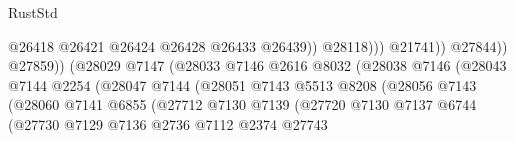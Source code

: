 \begin{lexlean}{RustStd}
\begin{coremodule}
                                                          @26418
                                                          @26421
                                                          @26424
                                                          @26428
                                                          @26433
                                                          @26439))
                                                      @28118)))
                                                @21741))
                                            @27844))
                                        @27859))
                                    (@28029
                                      @7147
                                      (@28033
                                        @7146
                                        @2616
                                        @8032
                                        (@28038
                                          @7146
                                          (@28043
                                            @7144
                                            @2254
                                            (@28047
                                              @7144
                                              (@28051
                                                @7143
                                                @5513
                                                @8208
                                                (@28056
                                                  @7143
                                                  (@28060
                                                    @7141
                                                    @6855
                                                    (@27712
                                                      @7130
                                                      @7139
                                                      (@27720
                                                        @7130
                                                        @7137
                                                        @6744
                                                        (@27730
                                                          @7129
                                                          @7136
                                                          @2736
                                                          @7112
                                                          @2374
                                                          @27743

\end{coremodule}
\end{lexlean}
